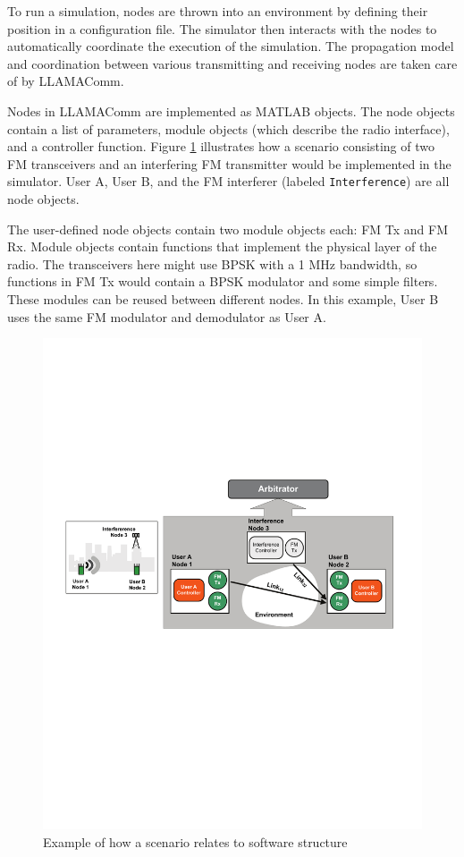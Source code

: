 To run a simulation, nodes are thrown into an environment by
defining their position in a configuration file.  The simulator then
interacts with the nodes to automatically coordinate the execution
of the simulation.  The propagation model and coordination between
various transmitting and receiving nodes are taken care of by
LLAMAComm.

Nodes in LLAMAComm are implemented as MATLAB objects.  The node
objects contain a list of parameters, module objects (which describe
the radio interface), and a controller function. Figure
\ref{fig:softwareOverview} illustrates how a scenario consisting of
two FM transceivers and an interfering FM transmitter would be
implemented in the simulator. User A, User B, and the FM interferer
(labeled \verb+Interference+) are all node objects.

The user-defined node objects contain two module objects each: FM Tx
and FM Rx.  Module objects contain functions that implement the
physical layer of the radio.  The transceivers here might use BPSK
with a 1 MHz bandwidth, so functions in FM Tx would contain a BPSK
modulator and some simple filters.  These modules can be reused
between different nodes.  In this example, User B uses the same FM
modulator and demodulator as User A.

\begin{figure}[h]
\centering
\includegraphics[width=6in]{figs/Software_Overview}
\caption{Example of how a scenario relates to software structure}
\label{fig:softwareOverview}
\end{figure}

